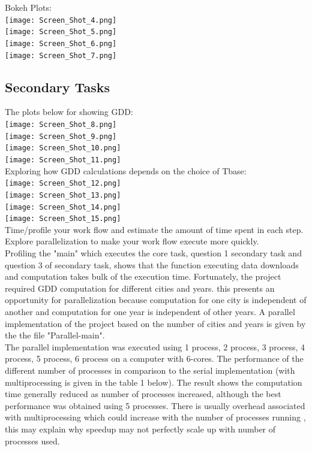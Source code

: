 Bokeh Plots:\\

\texttt{[image: Screen\_Shot\_4.png]}\\
\texttt{[image: Screen\_Shot\_5.png]}\\
\texttt{[image: Screen\_Shot\_6.png]}\\
\texttt{[image: Screen\_Shot\_7.png]}\\
  

\subsection{Secondary Tasks}
The plots below for showing GDD:\\

\texttt{[image: Screen\_Shot\_8.png]}\\
\texttt{[image: Screen\_Shot\_9.png]}\\
\texttt{[image: Screen\_Shot\_10.png]}\\
\texttt{[image: Screen\_Shot\_11.png]}\\

Exploring how GDD calculations depends on the choice of Tbase:\\

\texttt{[image: Screen\_Shot\_12.png]}\\
\texttt{[image: Screen\_Shot\_13.png]}\\
\texttt{[image: Screen\_Shot\_14.png]}\\
\texttt{[image: Screen\_Shot\_15.png]}\\

Time/profile your work flow and estimate the amount of time spent in each step. Explore parallelization to make your work flow execute more quickly.\\

Profiling the "main" which executes the core task, question 1 secondary task and question 3 of secondary task, shows that the function executing data downloads and computation takes bulk of the execution time. Fortunately, the project required GDD computation for different cities and years. this presents an opportunity for parallelization because computation for one city is independent of another and computation for one year is independent of other years. A parallel implementation of the project based on the number of cities and years is given by the the file "Parallel-main".\\
 The parallel implementation was executed using 1 process, 2 process, 3 process, 4 process, 5 process, 6 process on a computer with 6-cores. The performance of the different number of processes in comparison to the serial implementation (with multiprocessing is given in the table 1 below). The result shows the computation time generally reduced as number of processes increased, although the best performance was obtained using 5 processes. There is usually overhead associated with multiprocessing which could increase with the number of processes running , this may explain why speedup may not perfectly scale up with number of processes used.  

